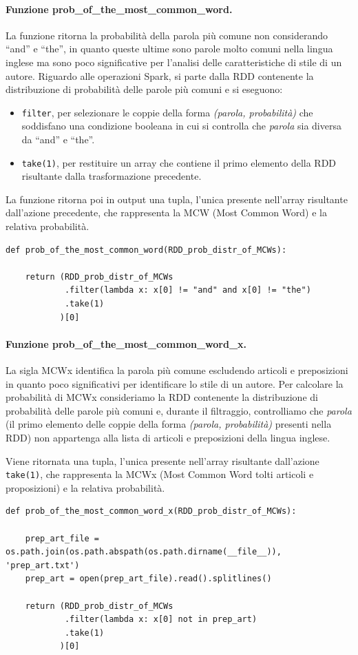 \documentclass[titlepage]{article}
\begin{document}
\paragraph{Funzione prob\_of\_the\_most\_common\_word.}
La funzione ritorna la probabilità della parola più comune non considerando ``and'' e ``the'', in quanto queste ultime sono parole molto comuni nella lingua inglese ma sono poco significative per l'analisi delle caratteristiche di stile di un autore. Riguardo alle operazioni Spark, si parte dalla RDD contenente la distribuzione di probabilità delle parole più comuni e si eseguono:
\begin{itemize}
    \item \texttt{filter}, per selezionare le coppie della forma \textit{(parola, probabilità)} che soddisfano una condizione booleana in cui si controlla che \textit{parola} sia diversa da ``and'' e ``the''.
    \item \texttt{take(1)}, per restituire un array che contiene il primo elemento della RDD risultante dalla trasformazione precedente.
\end{itemize}
La funzione ritorna poi in output una tupla, l'unica presente nell'array risultante dall'azione precedente, che rappresenta la MCW (Most Common Word) e la relativa probabilità.
\begin{verbatim}
def prob_of_the_most_common_word(RDD_prob_distr_of_MCWs):

    return (RDD_prob_distr_of_MCWs
            .filter(lambda x: x[0] != "and" and x[0] != "the")
            .take(1)
           )[0]
\end{verbatim}

\paragraph{Funzione prob\_of\_the\_most\_common\_word\_x.}
La sigla MCWx identifica la parola più comune escludendo articoli e preposizioni in quanto poco significativi per identificare lo stile di un autore. Per calcolare la probabilità di MCWx consideriamo la RDD contenente la distribuzione di probabilità delle parole più comuni e, durante il filtraggio, controlliamo che \textit{parola} (il primo elemento delle coppie della forma \textit{(parola, probabilità)} presenti nella RDD) non appartenga alla lista di articoli e preposizioni della lingua inglese.

Viene ritornata una tupla, l'unica presente nell'array risultante dall'azione \texttt{take(1)}, che rappresenta la MCWx (Most Common Word tolti articoli e proposizioni) e la relativa probabilità.
\begin{verbatim}
def prob_of_the_most_common_word_x(RDD_prob_distr_of_MCWs):
    
    prep_art_file = os.path.join(os.path.abspath(os.path.dirname(__file__)), 'prep_art.txt')
    prep_art = open(prep_art_file).read().splitlines()
    
    return (RDD_prob_distr_of_MCWs
            .filter(lambda x: x[0] not in prep_art)
            .take(1)
           )[0]
\end{verbatim}
\end{document}
